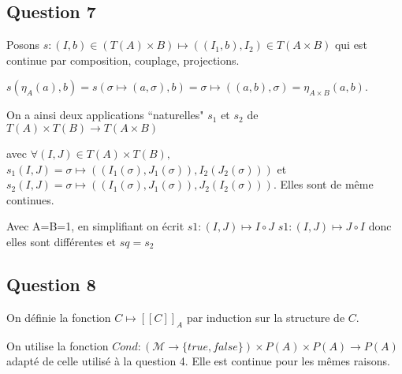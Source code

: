 \documentclass{article}
\newcommand{\M}{\mathcal{M}}
\newcommand{\Cr}[1]{[\![#1]\!]}
\begin{document}
\subsection*{Question 7}

Posons $s:\left (I, b\right )\in \left (T\left (A\right )\times B\right )\mapsto \left (\left (I_1, b\right ), I_2\right )\in T\left (A\times B\right )$ qui est continue par composition, couplage, projections.

$s\left (\eta_A\left (a\right ), b\right ) = s\left (\sigma \mapsto \left (a, \sigma\right ), b\right ) = \sigma \mapsto \left (\left (a, b\right ), \sigma\right ) = \eta_{A \times B}\left (a, b\right )$.





On a ainsi deux applications ``naturelles" $s_1$ et $s_2$ de $T\left (A\right ) \times T\left (B\right ) \rightarrow T\left (A \times B\right )$ 

avec $\forall \left (I, J\right ) \in T\left (A\right ) \times T\left (B\right ),\  $ $s_1\left (I, J\right ) = \sigma \mapsto \left (\left (I_1\left (\sigma\right ), J_1\left (\sigma\right )\right ), I_2\left (J_2\left (\sigma\right )\right )\right )$ et $s_2\left (I, J\right ) = \sigma \mapsto \left (\left (I_1\left (\sigma\right ), J_1\left (\sigma\right )\right ), J_2\left (I_2\left (\sigma\right )\right )\right )$. Elles sont de même continues.


Avec A=B=1, en simplifiant on écrit $s1:\left (I,J\right )\mapsto I \circ J$ $s1:\left (I,J\right )\mapsto J \circ I$ donc elles sont différentes et  $sq = s_2$

\subsection*{Question 8}

On définie la fonction $C \mapsto \Cr{C}_A$ par induction sur la structure de $C$.

On utilise la fonction $Cond : \left (\M \rightarrow \{ true, false \}\right ) \times P\left (A\right ) \times P\left (A\right )\rightarrow P\left (A\right )$ adapté de celle utilisé à la question 4. Elle est continue pour les mêmes raisons.
\end{document}
